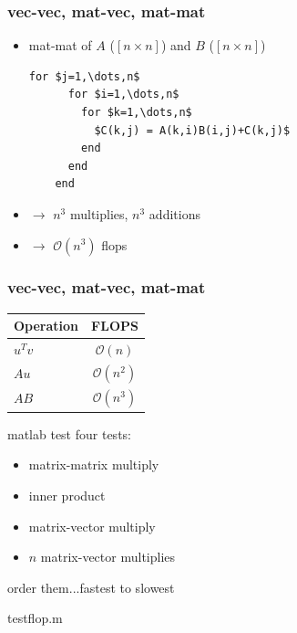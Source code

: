 \documentclass[10pt]{beamer}
\newcommand{\mO}{{\mathcal{O}}}
\begin{document}
\begin{frame}[fragile]
\frametitle{vec-vec, mat-vec, mat-mat}
\begin{itemize}
  \item mat-mat of $A$ ($[n \times n]$) and $B$ ($[n \times n]$)
  \begin{lstlisting}[mathescape]
    for $j=1,\dots,n$
      for $i=1,\dots,n$
        for $k=1,\dots,n$
          $C(k,j) = A(k,i)B(i,j)+C(k,j)$
        end
      end
    end
  \end{lstlisting}
  \item $\rightarrow$ $n^3$ multiplies, $n^3$ additions
  \item $\rightarrow$ $\mO(n^3)$ flops
\end{itemize}
\end{frame}
\begin{frame}
\frametitle{vec-vec, mat-vec, mat-mat}
\begin{center}
  \begin{tabular}{l c}\hline
  Operation & FLOPS \\\hline
  $u^T v$ & $\mO(n)$\\
  $Au$ & $\mO(n^2)$\\
  $AB$ & $\mO(n^3)$\\
  \end{tabular}
\end{center}
\begin{block}{matlab test}
  four tests:
    \begin{itemize}
      \item matrix-matrix multiply
      \item inner product
      \item matrix-vector multiply
      \item $n$ matrix-vector multiplies
    \end{itemize}
    order them...fastest to slowest
\end{block}
\begin{alertblock}{}
testflop.m
\end{alertblock}
\end{frame}
\end{document}
